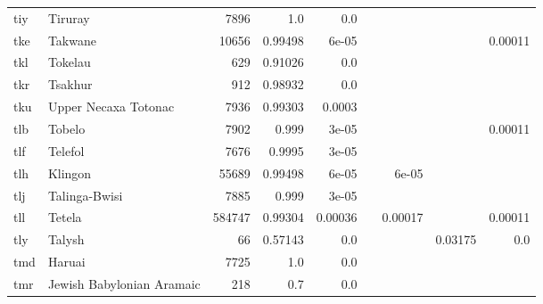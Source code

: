 \documentclass[11pt]{article}
\begin{document}
\begin{table*}[h]
{\begin{tabular}{llrrrrrrr}
tiy         & Tiruray         & 7896         & 1.0         & 0.0         &          &          &          &          \\

tke         & Takwane         & 10656         & 0.99498         & 6e-05         &          &          &          & 0.00011         \\

tkl         & Tokelau         & 629         & 0.91026         & 0.0         &          &          &          &          \\

tkr         & Tsakhur         & 912         & 0.98932         & 0.0         &          &          &          &          \\

tku         & Upper Necaxa Totonac         & 7936         & 0.99303         & 0.0003         &          &          &          &          \\

tlb         & Tobelo         & 7902         & 0.999         & 3e-05         &          &          &          & 0.00011         \\

tlf         & Telefol         & 7676         & 0.9995         & 3e-05         &          &          &          &          \\

tlh         & Klingon         & 55689         & 0.99498         & 6e-05         &          & 6e-05         &          &          \\

tlj         & Talinga-Bwisi         & 7885         & 0.999         & 3e-05         &          &          &          &          \\

tll         & Tetela         & 584747         & 0.99304         & 0.00036         &          & 0.00017         &          & 0.00011         \\

tly         & Talysh         & 66         & 0.57143         & 0.0         &          &          & 0.03175         & 0.0         \\

tmd         & Haruai         & 7725         & 1.0         & 0.0         &          &          &          &          \\

tmr         & Jewish Babylonian Aramaic         & 218         & 0.7         & 0.0         &          &          &          &          \\


\end{tabular}}
\end{table*}
\end{document}
